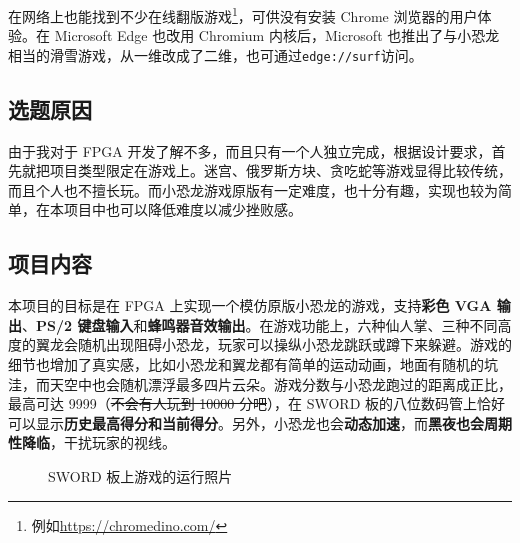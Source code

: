 \documentclass[hyperref,UTF8,12pt,a4paper]{ctexart}
\begin{document}
在网络上也能找到不少在线翻版游戏\footnote{例如\url{https://chromedino.com/}}，可供没有安装
Chrome 浏览器的用户体验。在 Microsoft Edge 也改用 Chromium
内核后，Microsoft
也推出了与小恐龙相当的滑雪游戏，从一维改成了二维，也可通过\texttt{edge://surf}访问。

\hypertarget{ux9009ux9898ux539fux56e0}{%
\subsection{选题原因}\label{ux9009ux9898ux539fux56e0}}

由于我对于 FPGA
开发了解不多，而且只有一个人独立完成，根据设计要求，首先就把项目类型限定在游戏上。迷宫、俄罗斯方块、贪吃蛇等游戏显得比较传统，而且个人也不擅长玩。而小恐龙游戏原版有一定难度，也十分有趣，实现也较为简单，在本项目中也可以降低难度以减少挫败感。

\hypertarget{ux9879ux76eeux5185ux5bb9}{%
\subsection{项目内容}\label{ux9879ux76eeux5185ux5bb9}}

本项目的目标是在 FPGA 上实现一个模仿原版小恐龙的游戏，支持\textbf{彩色
VGA 输出}、\textbf{PS/2
键盘输入}和\textbf{蜂鸣器音效输出}。在游戏功能上，六种仙人掌、三种不同高度的翼龙会随机出现阻碍小恐龙，玩家可以操纵小恐龙跳跃或蹲下来躲避。游戏的细节也增加了真实感，比如小恐龙和翼龙都有简单的运动动画，地面有随机的坑洼，而天空中也会随机漂浮最多四片云朵。游戏分数与小恐龙跑过的距离成正比，最高可达
9999（\sout{不会有人玩到 10000 分吧}），在 SWORD
板的八位数码管上恰好可以显示\textbf{历史最高得分和当前得分}。另外，小恐龙也会\textbf{动态加速}，而\textbf{黑夜也会周期性降临}，干扰玩家的视线。

\begin{figure}[H]
\centering
{}
\caption{SWORD 板上游戏的运行照片}
\end{figure}
\end{document}
